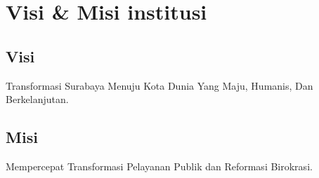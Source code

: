 \section{Visi \& Misi institusi}
\label{sec:visi-misi}

\subsection{Visi}
Transformasi Surabaya Menuju Kota Dunia Yang Maju, Humanis, Dan Berkelanjutan.

\subsection{Misi}
Mempercepat Transformasi Pelayanan Publik dan Reformasi Birokrasi.
